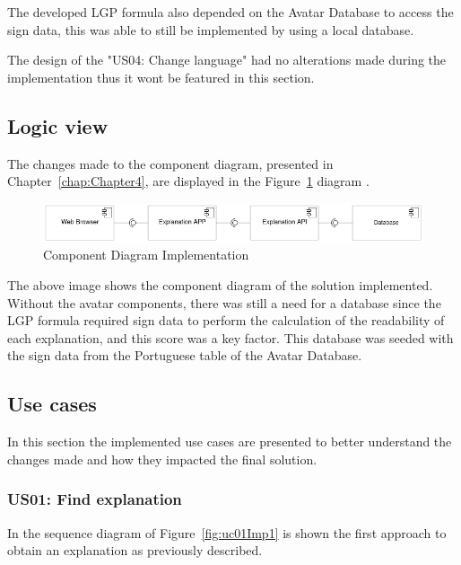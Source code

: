 The developed \gls{LGP} formula also depended on the Avatar Database to access the sign data, this was able to still be implemented by using a local database.

The design of the "US04: Change language" had no alterations made during the implementation thus it wont be featured in this section.

\subsection{Logic view}

The changes made to the component diagram, presented in Chapter~\ref{chap:Chapter4}, are displayed in the Figure~\ref{fig:componentImp} diagram .

\begin{figure}[H]
\centering
\includegraphics[width=\textwidth,keepaspectratio]{ch5/assets/component_diagram_Implement.png}
\caption[Component Diagram Implementation]{Component Diagram Implementation}
\label{fig:componentImp}
\end{figure}

The above image shows the component diagram of the solution implemented.
Without the avatar components, there was still a need for a database since the \gls{LGP} formula required sign data to perform the calculation of the readability of each explanation, and this score was a key factor.
This database was seeded with the sign data from the Portuguese table of the Avatar Database.

\subsection{Use cases}

In this section the implemented use cases are presented to better understand the changes made and how they impacted the final solution.

\subsubsection{US01: Find explanation}

In the sequence diagram of Figure~\ref{fig:uc01Imp1} is shown the first approach to obtain an explanation as previously described.

